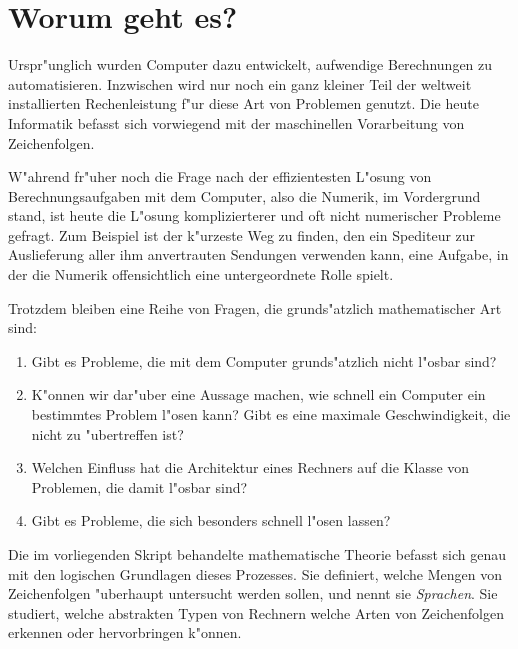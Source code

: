 %
%
%
\rhead{}
\chapter*{Worum geht es?}
Urspr"unglich wurden Computer dazu entwickelt, aufwendige
Berechnungen zu automatisieren. Inzwischen wird nur noch ein
ganz kleiner Teil der weltweit installierten Rechenleistung f"ur
diese Art von Problemen genutzt. 
Die heute Informatik befasst sich vorwiegend mit der maschinellen Vorarbeitung von
Zeichenfolgen. 

W"ahrend fr"uher noch die Frage nach der effizientesten L"osung von
Berechnungsaufgaben mit dem Computer, also die Numerik, im Vordergrund stand,  
ist heute die L"osung komplizierterer und oft nicht numerischer Probleme 
gefragt. Zum Beispiel ist der k"urzeste Weg zu finden, den ein Spediteur
zur Auslieferung aller ihm anvertrauten Sendungen verwenden kann, eine
Aufgabe, in der die Numerik offensichtlich eine untergeordnete Rolle spielt.

Trotzdem bleiben eine Reihe von Fragen, die grunds"atzlich mathematischer
Art sind:
\begin{enumerate}
\item Gibt es Probleme, die mit dem Computer grunds"atzlich nicht
l"osbar sind?
\item K"onnen wir dar"uber eine Aussage machen, wie schnell ein Computer
ein bestimmtes Problem l"osen kann? Gibt es eine maximale Geschwindigkeit,
die nicht zu "ubertreffen ist?
\item Welchen Einfluss hat die Architektur eines Rechners auf die Klasse
von Problemen, die damit l"osbar sind?
\item Gibt es Probleme, die sich besonders schnell l"osen lassen?
\end{enumerate}
Die im vorliegenden Skript behandelte mathematische Theorie befasst sich
genau mit den logischen Grundlagen dieses Prozesses.
Sie definiert, welche Mengen von Zeichenfolgen "uberhaupt untersucht
werden sollen, und nennt sie {\em Sprachen}.
Sie studiert, welche abstrakten Typen von
Rechnern welche Arten von Zeichenfolgen erkennen oder hervorbringen
k"onnen. 

